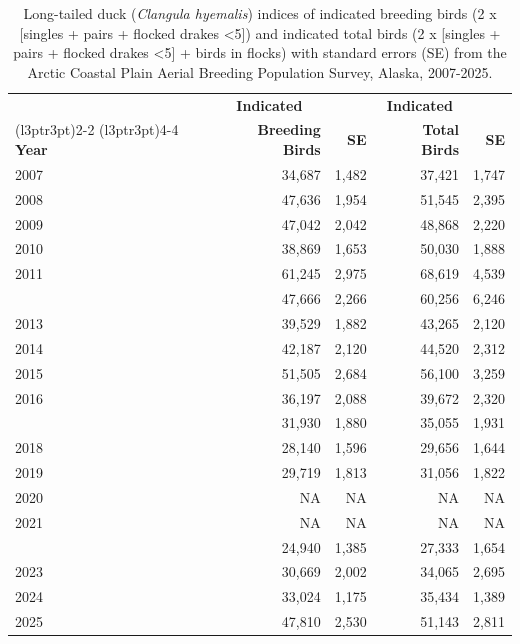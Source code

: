 \documentclass[
]{article}
\begin{document}
\begin{longtable}[t]{lrrrr}

\caption{\label{tbl-LTDU}Long-tailed duck (\emph{Clangula hyemalis})
indices of indicated breeding birds (2 x {[}singles + pairs + flocked
drakes \textless5{]}) and indicated total birds (2 x {[}singles + pairs
+ flocked drakes \textless5{]} + birds in flocks) with standard errors
(SE) from the Arctic Coastal Plain Aerial Breeding Population Survey,
Alaska, 2007-2025.}

\tabularnewline

\\
\toprule
\multicolumn{1}{c}{\textbf{ }} & \multicolumn{1}{c}{\textbf{Indicated}} & \multicolumn{1}{c}{\textbf{ }} & \multicolumn{1}{c}{\textbf{Indicated}} & \multicolumn{1}{c}{\textbf{ }} \\
\cmidrule(l{3pt}r{3pt}){2-2} \cmidrule(l{3pt}r{3pt}){4-4}
\textbf{Year} & \textbf{Breeding Birds} & \textbf{SE} & \textbf{Total Birds} & \textbf{SE}\\
\midrule
2007 & 34,687 & 1,482 & 37,421 & 1,747\\
2008 & 47,636 & 1,954 & 51,545 & 2,395\\
2009 & 47,042 & 2,042 & 48,868 & 2,220\\
2010 & 38,869 & 1,653 & 50,030 & 1,888\\
2011 & 61,245 & 2,975 & 68,619 & 4,539\\
\addlinespace
2012 & 47,666 & 2,266 & 60,256 & 6,246\\
2013 & 39,529 & 1,882 & 43,265 & 2,120\\
2014 & 42,187 & 2,120 & 44,520 & 2,312\\
2015 & 51,505 & 2,684 & 56,100 & 3,259\\
2016 & 36,197 & 2,088 & 39,672 & 2,320\\
\addlinespace
2017 & 31,930 & 1,880 & 35,055 & 1,931\\
2018 & 28,140 & 1,596 & 29,656 & 1,644\\
2019 & 29,719 & 1,813 & 31,056 & 1,822\\
2020 & NA & NA & NA & NA\\
2021 & NA & NA & NA & NA\\
\addlinespace
2022 & 24,940 & 1,385 & 27,333 & 1,654\\
2023 & 30,669 & 2,002 & 34,065 & 2,695\\
2024 & 33,024 & 1,175 & 35,434 & 1,389\\
2025 & 47,810 & 2,530 & 51,143 & 2,811\\
\bottomrule

\end{longtable}
\end{document}
